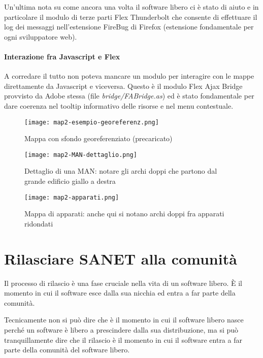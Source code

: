 \documentclass[a4wide,10pt,italian]{manual}
\begin{document}
Un'ultima nota su come ancora una volta il software libero ci è stato di aiuto
e in particolare il modulo di terze parti Flex Thunderbolt
che consente di effettuare il log dei messaggi nell'estensione FireBug di Firefox
(estensione fondamentale per ogni sviluppatore web).


\subsubsection{Interazione fra Javascript e Flex}

A corredare il tutto non poteva mancare un modulo per interagire con le mappe direttamente da Javascript
e viceversa. Questo è il modulo Flex Ajax Bridge provvisto da Adobe stessa (file \emph{bridge/FABridge.as}) ed è
stato fondamentale per dare coerenza nel tooltip informativo delle risorse e nel menu contestuale.
\begin{figure}[htbp]
\centering

\texttt{[image: map2-esempio-georeferenz.png]}
\caption{Mappa con sfondo georeferenziato (precaricato)}\end{figure}
\begin{figure}[htbp]
\centering

\texttt{[image: map2-MAN-dettaglio.png]}
\caption{Dettaglio di una MAN: notare gli archi doppi che partono dal grande edificio giallo a destra}\end{figure}
\begin{figure}[htbp]
\centering

\texttt{[image: map2-apparati.png]}
\caption{Mappa di apparati: anche qui si notano archi doppi fra apparati ridondati}\end{figure}

\resetcurrentobjects
\hypertarget{--doc-release}{}

\chapter{Rilasciare SANET alla comunità}

Il processo di rilascio è una fase cruciale nella vita di un software libero.
È il momento in cui il software esce dalla sua nicchia ed entra a far parte della comunità.

Tecnicamente non si può dire che è il momento in cui il software libero nasce perché
un software è libero a prescindere dalla sua distribuzione, ma si può tranquillamente dire
che il rilascio è il momento in cui il software entra a far parte della comunità del software libero.
\end{document}
